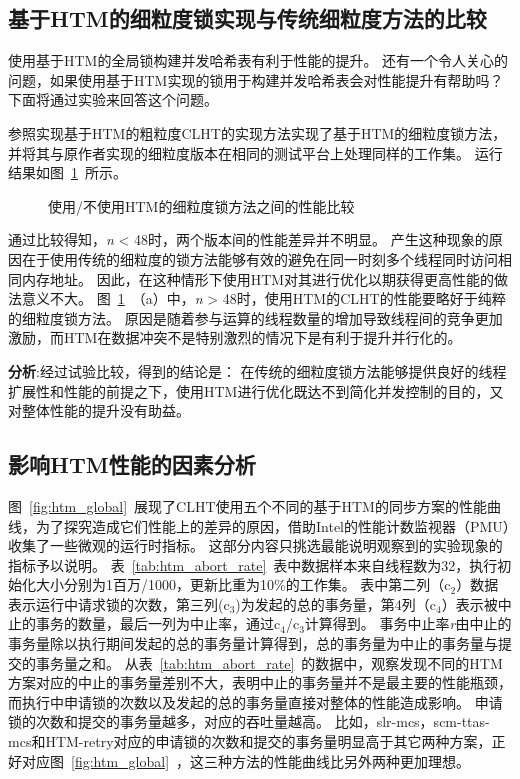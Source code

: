 \subsection{基于HTM的细粒度锁实现与传统细粒度方法的比较}
使用基于HTM的全局锁构建并发哈希表有利于性能的提升。
还有一个令人关心的问题，如果使用基于HTM实现的锁用于构建并发哈希表会对性能提升有帮助吗？
下面将通过实验来回答这个问题。

参照实现基于HTM的粗粒度CLHT的实现方法实现了基于HTM的细粒度锁方法，并将其与原作者实现的细粒度版本在相同的测试平台上处理同样的工作集。
运行结果如图~\ref{fig:htm_fine_grained}~所示。
\begin{figure}[htbp]
\centering
\caption{使用/不使用HTM的细粒度锁方法之间的性能比较}
\label{fig:htm_fine_grained}
\end{figure}
通过比较得知，\textit{n} < 48时，两个版本间的性能差异并不明显。
产生这种现象的原因在于使用传统的细粒度的锁方法能够有效的避免在同一时刻多个线程同时访问相同内存地址。
因此，在这种情形下使用HTM对其进行优化以期获得更高性能的做法意义不大。
图~\ref{fig:htm_fine_grained}~（a）中，\textit{n} > 48时，使用HTM的CLHT的性能要略好于纯粹的细粒度锁方法。
原因是随着参与运算的线程数量的增加导致线程间的竞争更加激励，而HTM在数据冲突不是特别激烈的情况下是有利于提升并行化的。

\textbf{分析}:经过试验比较，得到的结论是：
在传统的细粒度锁方法能够提供良好的线程扩展性和性能的前提之下，使用HTM进行优化既达不到简化并发控制的目的，又对整体性能的提升没有助益。

\subsection{影响HTM性能的因素分析}
\label{sec:htm_analysis}

图~\ref{fig:htm_global}~展现了CLHT使用五个不同的基于HTM的同步方案的性能曲线，为了探究造成它们性能上的差异的原因，借助Intel的性能计数监视器（PMU）收集了一些微观的运行时指标。
这部分内容只挑选最能说明观察到的实验现象的指标予以说明。
表~\ref{tab:htm_abort_rate}~表中数据样本来自线程数为32，执行初始化大小分别为1百万/1000，更新比重为10\%的工作集。
表中第二列（c$_2$）数据表示运行中请求锁的次数，第三列(c$_3$)为发起的总的事务量，第4列（c$_4$）表示被中止的事务的数量，最后一列为中止率，通过c$_4$/c$_3$计算得到。
事务中止率\textit{r}由中止的事务量除以执行期间发起的总的事务量计算得到，总的事务量为中止的事务量与提交的事务量之和。
从表~\ref{tab:htm_abort_rate}~的数据中，观察发现不同的HTM方案对应的中止的事务量差别不大，表明中止的事务量并不是最主要的性能瓶颈，而执行中申请锁的次数以及发起的总的事务量直接对整体的性能造成影响。
申请锁的次数和提交的事务量越多，对应的吞吐量越高。
比如，slr-mcs，scm-ttas-mcs和HTM-retry对应的申请锁的次数和提交的事务量明显高于其它两种方案，正好对应图~\ref{fig:htm_global}~，这三种方法的性能曲线比另外两种更加理想。

